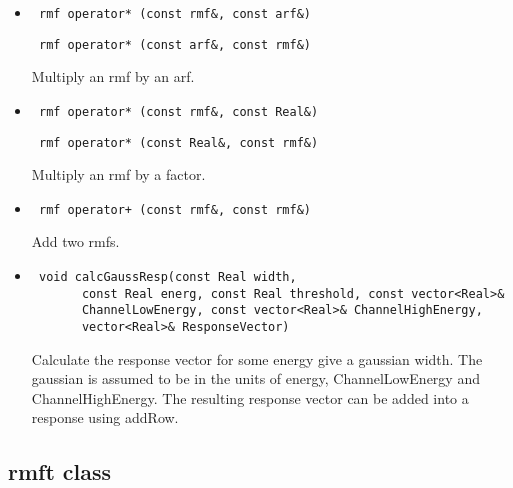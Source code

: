 \documentclass[11pt]{book}
\begin{document}
\begin{itemize}

\item  \begin{verbatim} rmf operator* (const rmf&, const arf&) \end{verbatim}
       \begin{verbatim} rmf operator* (const arf&, const rmf&) \end{verbatim}

          Multiply an rmf by an arf.

\item  \begin{verbatim} rmf operator* (const rmf&, const Real&) \end{verbatim}
       \begin{verbatim} rmf operator* (const Real&, const rmf&) \end{verbatim}

          Multiply an rmf by a factor.

\item  \begin{verbatim} rmf operator+ (const rmf&, const rmf&) \end{verbatim}

          Add two rmfs.

\item  \begin{verbatim} void calcGaussResp(const Real width, 
       const Real energ, const Real threshold, const vector<Real>& 
       ChannelLowEnergy, const vector<Real>& ChannelHighEnergy, 
       vector<Real>& ResponseVector)  \end{verbatim}

          Calculate the response vector for some energy give a gaussian width.
          The gaussian is assumed to be in the units of energy,
          ChannelLowEnergy and ChannelHighEnergy. The resulting
          response vector can be added into a response using addRow.

\end{itemize}

\subsection{rmft class}
\end{document}
